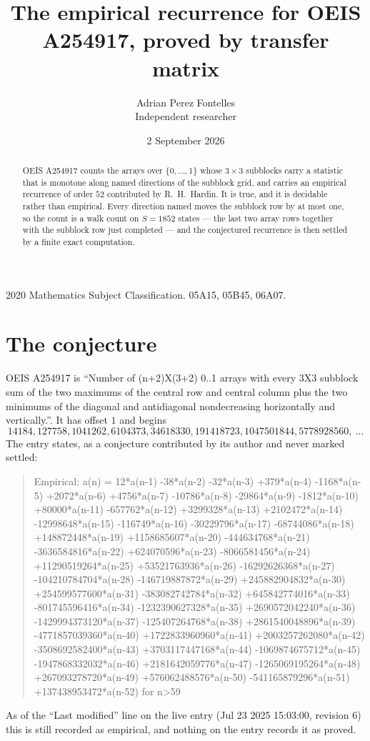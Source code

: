 \documentclass[11pt,a4paper]{article}
\title{The empirical recurrence for OEIS A254917, proved by transfer matrix}
\author{Adrian Perez Fontelles\\ \small Independent researcher}
\date{2 September 2026}
\theoremstyle{plain}
\theoremstyle{definition}
\begin{document}
\maketitle

\begin{abstract}
OEIS A254917 counts the arrays over $\{0,\dots,1\}$ whose $3\times3$ subblocks carry a
statistic that is monotone along named directions of the subblock grid, and carries an
empirical recurrence of order $52$ contributed by R.~H.~Hardin. It is true, and it is
decidable rather than empirical. Every direction named moves the subblock row by at most one,
so the count is a walk count on $S=1852$ states --- the last two array rows together with the
subblock row just completed --- and the conjectured recurrence is then settled by a finite
exact computation.
\end{abstract}

\noindent\small 2020 Mathematics Subject Classification. 05A15, 05B45, 06A07.\normalsize

\section{The conjecture}

OEIS A254917 is ``Number of (n+2)X(3+2) 0..1 arrays with every 3X3 subblock sum of the two maximums of the central row and central column plus the two minimums of the diagonal and antidiagonal nondecreasing horizontally and vertically.''. It has offset $1$ and begins
\[
14184, 127758, 1041262, 6104373, 34618330, 191418723, 1047501844, 5778928560,\ \dots
\]
The entry states, as a conjecture contributed by its author and never marked settled:
\begin{quote}
Empirical: a(n) = 12*a(n-1) -38*a(n-2) -32*a(n-3) +379*a(n-4) -1168*a(n-5) +2072*a(n-6) +4756*a(n-7) -10786*a(n-8) -29864*a(n-9) -1812*a(n-10) +80000*a(n-11) -657762*a(n-12) +3299328*a(n-13) +2102472*a(n-14) -12998648*a(n-15) -116749*a(n-16) -30229796*a(n-17) -68744086*a(n-18) +148872448*a(n-19) +1158685607*a(n-20) -444634768*a(n-21) -3636584816*a(n-22) +624070596*a(n-23) -8066581456*a(n-24) +11290519264*a(n-25) +53521763936*a(n-26) -16292626368*a(n-27) -104210784704*a(n-28) -146719887872*a(n-29) +245882904832*a(n-30) +254599577600*a(n-31) -383082742784*a(n-32) +645842774016*a(n-33) -801745596416*a(n-34) -1232390627328*a(n-35) +2690572042240*a(n-36) -1429994373120*a(n-37) -125407264768*a(n-38) +2861540048896*a(n-39) -4771857039360*a(n-40) +1722833960960*a(n-41) +2003257262080*a(n-42) -3508692582400*a(n-43) +3703117447168*a(n-44) -1069874675712*a(n-45) -1947868332032*a(n-46) +2181642059776*a(n-47) -1265069195264*a(n-48) +267093278720*a(n-49) +576062488576*a(n-50) -541165879296*a(n-51) +137438953472*a(n-52) for n>59
\end{quote}
As of the ``Last modified'' line on the live entry (Jul 23 2025 15:03:00, revision 6) this is still
recorded as empirical, and nothing on the entry records it as proved.
\end{document}
